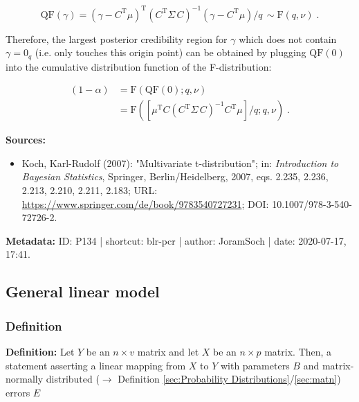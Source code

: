 \documentclass[a4paper,12pt,twoside]{book}
\begin{document}
\begin{equation} \label{eq:blr-pcr-GLM-NG-post-qf}
\mathrm{QF}(\gamma) = (\gamma - C^\mathrm{T} \mu)^\mathrm{T} (C^\mathrm{T} \Sigma \, C)^{-1} (\gamma - C^\mathrm{T} \mu) /q \, \sim \mathrm{F}(q,\nu) \; .
\end{equation}

Therefore, the largest posterior credibility region for $\gamma$ which does not contain $\gamma = 0_q$ (i.e. only touches this origin point) can be obtained by plugging $\mathrm{QF}(0)$ into the cumulative distribution function of the F-distribution:

\begin{equation} \label{eq:blr-pcr-GLM-NG-post-cred-reg-not-H0}
\begin{split}
(1-\alpha) &= \mathrm{F}\left( \mathrm{QF}(0); q, \nu \right) \\
&= \mathrm{F}\left( \left[ \mu^\mathrm{T} C (C^\mathrm{T} \Sigma \, C)^{-1} C^\mathrm{T} \mu \right]/q; q, \nu \right) \; .
\end{split}
\end{equation}


\vspace{1em}
\textbf{Sources:}
\begin{itemize}
\item Koch, Karl-Rudolf (2007): "Multivariate t-distribution"; in: \textit{Introduction to Bayesian Statistics}, Springer, Berlin/Heidelberg, 2007, eqs. 2.235, 2.236, 2.213, 2.210, 2.211, 2.183; URL: \url{https://www.springer.com/de/book/9783540727231}; DOI: 10.1007/978-3-540-72726-2.
\end{itemize}


\vspace{1em}
\textbf{Metadata:} ID: P134 | shortcut: blr-pcr | author: JoramSoch | date: 2020-07-17, 17:41.
\vspace{1em}



\subsection{General linear model}

\subsubsection[\textit{Definition}]{Definition} \label{sec:glm}
\setcounter{equation}{0}

\textbf{Definition:} Let $Y$ be an $n \times v$ matrix and let $X$ be an $n \times p$ matrix. Then, a statement asserting a linear mapping from $X$ to $Y$ with parameters $B$ and matrix-normally distributed ($\rightarrow$ Definition \ref{sec:Probability Distributions}/\ref{sec:matn}) errors $E$
\end{document}
